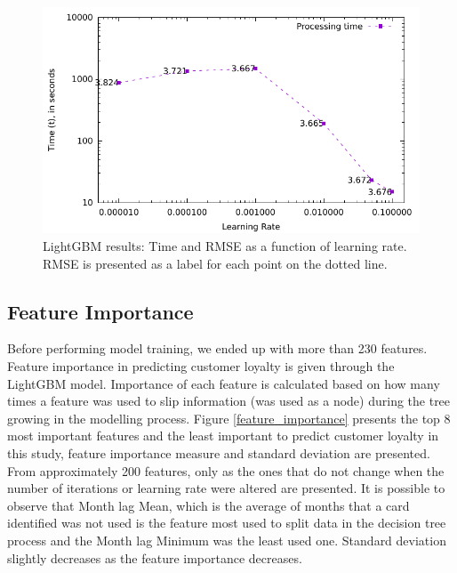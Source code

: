 \documentclass[letterpaper, 10 pt, conference]{ieeeconf}  %
\begin{document}
\begin{figure}[thpb]
\centering
\includegraphics[scale=0.7]{Figures/time.pdf}
\caption{LightGBM results: Time and RMSE as a function of learning rate. RMSE is presented as a label for each point on the dotted line.}
\label{time}
\end{figure}


\subsection{Feature Importance}
Before performing model training, we ended up with more than 230 features. Feature importance in predicting customer loyalty is given through the LightGBM model. Importance of each feature is calculated based on how many times a feature was used to slip information (was used as a node) during the tree growing in the modelling process. Figure \ref{feature_importance} presents the top 8 most important features and the least important to predict customer loyalty in this study, feature importance measure and standard deviation are presented. From approximately 200 features, only as the ones that do not change when the number of iterations or learning rate were altered are presented. It is possible to observe that Month lag Mean, which is the average of months that a card identified was not used is the feature most used to split data in the decision tree process and the Month lag Minimum was the least used one. Standard deviation slightly decreases as the feature importance decreases.
\end{document}
